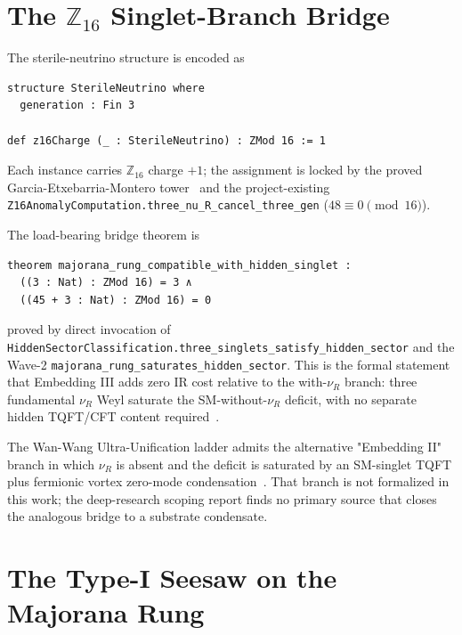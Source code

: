 \documentclass[aps,prd,twocolumn,showpacs,superscriptaddress,nofootinbib]{revtex4-2}
\newcommand{\SterileNu}{\nu_R}
\begin{document}
\section{The $\mathbb{Z}_{16}$ Singlet-Branch Bridge}
\label{sec:z16-bridge}

The sterile-neutrino structure is encoded as
\begin{verbatim}
structure SterileNeutrino where
  generation : Fin 3

def z16Charge (_ : SterileNeutrino) : ZMod 16 := 1
\end{verbatim}
Each instance carries $\mathbb{Z}_{16}$ charge $+1$; the assignment
is locked by the proved Garcia-Etxebarria-Montero
tower~\cite{GarciaEtxebarriaMontero2019} and the project-existing
\texttt{Z16AnomalyComputation.three\_nu\_R\_cancel\_three\_gen}
($48 \equiv 0 \pmod{16}$).

The load-bearing bridge theorem is
\begin{verbatim}
theorem majorana_rung_compatible_with_hidden_singlet :
  ((3 : Nat) : ZMod 16) = 3 ∧
  ((45 + 3 : Nat) : ZMod 16) = 0
\end{verbatim}
proved by direct invocation of
\texttt{HiddenSectorClassification.three\_singlets\_satisfy\_hidden\_sector}
and the Wave-2 \texttt{majorana\_rung\_saturates\_hidden\_sector}.
This is the formal statement that Embedding III adds zero IR cost
relative to the with-$\nu_R$ branch: three fundamental $\SterileNu$
Weyl saturate the SM-without-$\nu_R$ deficit, with no separate hidden
TQFT/CFT content required~\cite{WanWang2020}.

The Wan-Wang Ultra-Unification ladder admits the alternative
"Embedding II" branch in which $\nu_R$ is absent and the deficit is
saturated by an SM-singlet TQFT plus fermionic vortex zero-mode
condensation~\cite{WanWang2020}. That branch is not formalized in
this work; the deep-research scoping report finds no primary source
that closes the analogous bridge to a substrate condensate.

\section{The Type-I Seesaw on the Majorana Rung}
\label{sec:seesaw}
\end{document}
